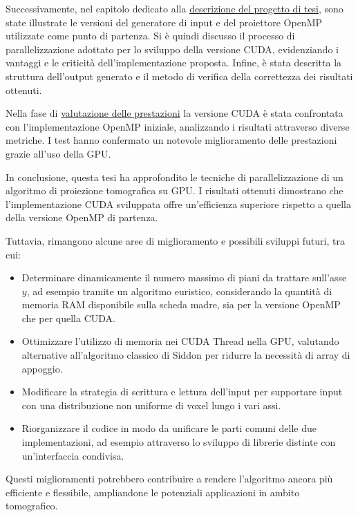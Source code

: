 \documentclass[12pt,a4paper]{report}
\begin{document}
Successivamente, nel capitolo dedicato alla \hyperref[chap:proj]{descrizione del progetto di tesi}, sono state illustrate le
versioni del generatore di input e del proiettore OpenMP utilizzate come punto di partenza.
Si è quindi discusso il processo di parallelizzazione adottato per lo sviluppo della versione CUDA, evidenziando i vantaggi e le
criticità dell'implementazione proposta.
Infine, è stata descritta la struttura dell'output generato e il metodo di verifica della correttezza dei risultati ottenuti.

Nella fase di \hyperref[chap:perf]{valutazione delle prestazioni} la versione CUDA è stata confrontata con l'implementazione
OpenMP iniziale, analizzando i risultati attraverso diverse metriche.
I test hanno confermato un notevole miglioramento delle prestazioni grazie all'uso della GPU.

In conclusione, questa tesi ha approfondito le tecniche di parallelizzazione di un algoritmo di proiezione tomografica su GPU.
I risultati ottenuti dimostrano che l'implementazione CUDA sviluppata offre un'efficienza superiore rispetto a quella della
versione OpenMP di partenza.

Tuttavia, rimangono alcune aree di miglioramento e possibili sviluppi futuri, tra cui:
\begin{itemize}
  \item Determinare dinamicamente il numero massimo di piani da trattare sull'asse \(y\), ad esempio tramite un algoritmo
        euristico, considerando la quantità di memoria RAM disponibile sulla scheda madre, sia per la versione OpenMP che per
        quella CUDA.
  \item Ottimizzare l'utilizzo di memoria nei CUDA Thread nella GPU, valutando alternative all'algoritmo classico di Siddon per
        ridurre la necessità di array di appoggio.
  \item Modificare la strategia di scrittura e lettura dell'input per supportare input con una distribuzione non uniforme di voxel
        lungo i vari assi.
  \item Riorganizzare il codice in modo da unificare le parti comuni delle due implementazioni, ad esempio attraverso lo sviluppo
        di librerie distinte con un'interfaccia condivisa.
\end{itemize}

Questi miglioramenti potrebbero contribuire a rendere l'algoritmo ancora più efficiente e flessibile, ampliandone le potenziali
applicazioni in ambito tomografico.

\label{mylastpage}
\printbibliography %
\thispagestyle{empty} %
\pagestyle{empty} %
\end{document}
